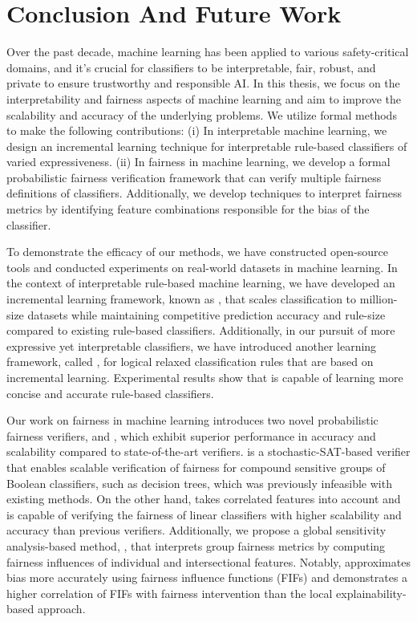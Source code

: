 \chapter{Conclusion And Future Work}
\label{chapter:conclusion} 
Over the past decade, machine learning has been applied to various safety-critical domains, and it's crucial for classifiers to be interpretable, fair, robust, and private to ensure trustworthy and responsible AI. In this thesis, we focus on the interpretability and fairness aspects of machine learning and aim to improve the scalability and accuracy of the underlying problems. We utilize formal methods to make the following contributions: (i) In interpretable machine learning, we design an incremental learning technique for interpretable rule-based classifiers of varied expressiveness. (ii) In fairness in machine learning, we develop a formal probabilistic fairness verification framework that can verify multiple fairness definitions of classifiers.  Additionally, we develop techniques to interpret fairness metrics by identifying feature combinations responsible for the bias of the classifier.



To demonstrate the efficacy of our methods, we have constructed open-source tools and conducted experiments on real-world datasets in machine learning. In the context of interpretable rule-based machine learning, we have developed an incremental learning framework, known as {\imli}, that scales classification to million-size datasets while maintaining competitive prediction accuracy and rule-size compared to existing rule-based classifiers. Additionally, in our pursuit of more expressive yet interpretable classifiers, we have introduced another learning framework, called {\crr}, for logical relaxed classification rules that are based on incremental learning. Experimental results show that {\crr} is capable of learning more concise and accurate rule-based classifiers.


Our work on fairness in machine learning introduces two novel probabilistic fairness verifiers, {\justicia} and {\fvgm}, which exhibit superior performance in accuracy and scalability compared to state-of-the-art verifiers. {\justicia} is a stochastic-SAT-based verifier that enables scalable verification of fairness for compound sensitive groups of Boolean classifiers, such as decision trees, which was previously infeasible with existing methods. On the other hand, {\fvgm} takes correlated features into account and is capable of verifying the fairness of linear classifiers with higher scalability and accuracy than previous verifiers. Additionally, we propose a global sensitivity analysis-based method, {\fairXplainer}, that interprets group fairness metrics by computing fairness influences of individual and intersectional features. Notably, {\fairXplainer} approximates bias more accurately using fairness influence functions (FIFs) and demonstrates a higher correlation of FIFs with fairness intervention than the local explainability-based approach.


